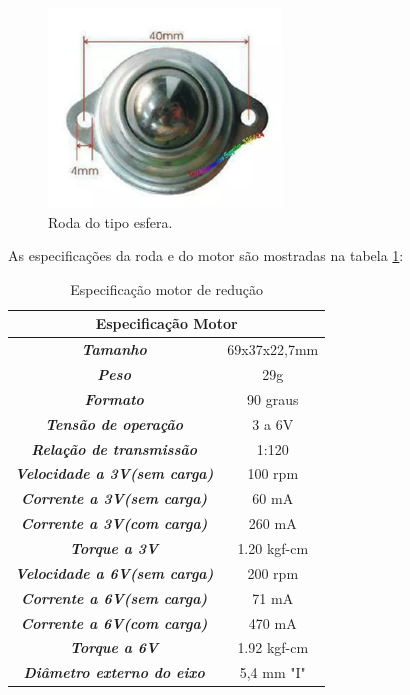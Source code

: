 			\begin{figure}[H]
				\centering
				\includegraphics[scale=0.7]{figuras/esfera.png}
				\caption{Roda do tipo esfera.}
				\label{img:esfera}
			\end{figure}

			As especificações da roda e do motor são mostradas na tabela \ref{tab:motor_red}:

			\begin{table}[H]
				\centering
				\caption{Especificação motor de redução}
				\label{tab:motor_red}
				\begin{tabular}{|c|c|}
					\hline
					\multicolumn{2}{|c|}{\cellcolor[HTML]{C0C0C0}\textbf{Especificação Motor}} \\ \hline
					\textit{\textbf{Tamanho}}                            & 69x37x22,7mm        \\ \hline
					\textit{\textbf{Peso}}                               & 29g                 \\ \hline
					\textit{\textbf{Formato}}                            & 90 graus            \\ \hline
					\textit{\textbf{Tensão de operação}}                 & 3 a 6V              \\ \hline
					\textit{\textbf{Relação de transmissão}}             & 1:120               \\ \hline
					\textit{\textbf{Velocidade a 3V(sem carga)}}         & 100 rpm             \\ \hline
					\textit{\textbf{Corrente a 3V(sem carga)}}           & 60 mA               \\ \hline
					\textit{\textbf{Corrente a 3V(com carga)}}           & 260 mA              \\ \hline
					\textit{\textbf{Torque a 3V}}                        & 1.20 kgf-cm         \\ \hline
					\textit{\textbf{Velocidade a 6V(sem carga)}}         & 200 rpm             \\ \hline
					\textit{\textbf{Corrente a 6V(sem carga)}}           & 71 mA               \\ \hline
					\textit{\textbf{Corrente a 6V(com carga)}}           & 470 mA              \\ \hline
					\textit{\textbf{Torque a 6V}}                        & 1.92 kgf-cm         \\ \hline
					\textit{\textbf{Diâmetro externo do eixo}}           & 5,4 mm "I"          \\ \hline
				\end{tabular}
			\end{table}

